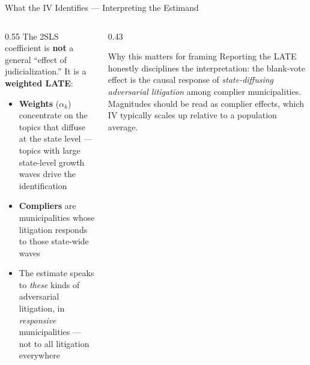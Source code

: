 \documentclass[aspectratio=169,10pt]{beamer}
\begin{document}
\begin{frame}{What the IV Identifies --- Interpreting the Estimand}
\begin{columns}[T]
\begin{column}{0.55\textwidth}
The 2SLS coefficient is \textbf{not} a general ``effect of judicialization.'' It is a \textbf{weighted LATE}:
\begin{itemize}
  \item \textbf{Weights} ($\alpha_k$) concentrate on the topics that diffuse at the state level --- topics with large state-level growth waves drive the identification
  \item \textbf{Compliers} are municipalities whose litigation responds to those state-wide waves
  \item The estimate speaks to \emph{these} kinds of adversarial litigation, in \emph{responsive} municipalities --- not to all litigation everywhere
\end{itemize}
\end{column}
\begin{column}{0.43\textwidth}
\begin{alertblock}{Why this matters for framing}
  \footnotesize
  Reporting the LATE honestly disciplines the interpretation: the blank-vote effect is the causal response of \emph{state-diffusing adversarial litigation} among complier municipalities. Magnitudes should be read as complier effects, which IV typically scales up relative to a population average.
\end{alertblock}
\end{column}
\end{columns}
\end{frame}
\end{document}
